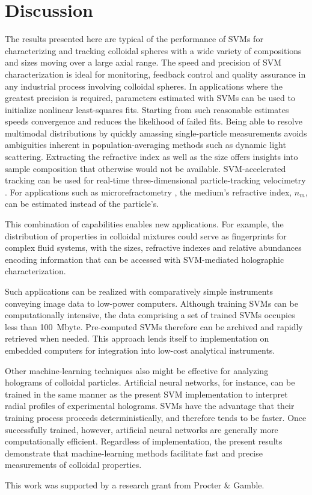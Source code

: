 \section{Discussion}

The results presented here are typical of the performance of SVMs
for characterizing and tracking colloidal spheres with a wide
variety of compositions and sizes moving over a large axial range.
The speed and precision of SVM characterization
is ideal for monitoring, feedback control and quality assurance
in any industrial process involving colloidal spheres.
In applications where the greatest precision is required, parameters
estimated with SVMs can be used to initialize nonlinear least-squares
fits.
Starting from such reasonable estimates speeds convergence and
reduces the likelihood of failed fits.
Being able to resolve multimodal distributions
by quickly amassing single-particle measurements
avoids ambiguities inherent in population-averaging
methods such as dynamic light scattering.
Extracting the refractive index as well as the size offers
insights into sample composition that otherwise would
not be available.
SVM-accelerated tracking can be used for real-time
three-dimensional particle-tracking velocimetry \cite{cheong09}.
For applications such as microrefractometry \cite{shpaisman12},
the medium's refractive index, $n_m$, can 
be estimated instead of the particle's.

This combination of capabilities enables new applications.
For example, the distribution of properties in colloidal mixtures
could serve as fingerprints for complex fluid systems, with the
sizes, refractive indexes and relative abundances encoding information
that can be accessed with SVM-mediated holographic
characterization.

Such applications can be realized with comparatively
simple instruments \cite{krishnatreya14} conveying image data
to low-power computers.
Although training SVMs can be computationally intensive,
the data comprising a set of trained SVMs occupies less
than \SI{100}{\mega byte}.
Pre-computed SVMs therefore can be archived and rapidly
retrieved when needed.
This approach lends itself to
implementation on embedded computers for integration into
low-cost analytical instruments.

Other machine-learning techniques also might be effective
for analyzing holograms of colloidal particles.  Artificial
neural networks, for instance, can be trained in the same
manner as the present SVM implementation to interpret
radial profiles of experimental holograms.  SVMs have the advantage
that their training process proceeds deterministically, and therefore
tends to be faster.  Once successfully trained, however, artificial
neural networks are generally more computationally efficient.
Regardless of implementation, the present results demonstrate
that machine-learning methods facilitate
fast and precise measurements of colloidal properties.


This work was supported by a research grant from Procter \& Gamble.
